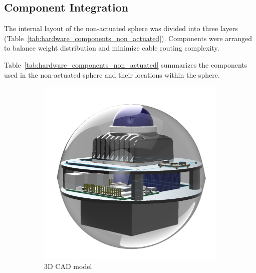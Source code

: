 \documentclass[english, bachelor, utf8]{base/thesis_telematics}
\begin{document}
\subsection{Component Integration}
The internal layout of the non-actuated sphere was divided into three layers (Table~\ref{tab:hardware_components_non_actuated}).
Components were arranged to balance weight distribution and minimize cable routing complexity.

Table~\ref{tab:hardware_components_non_actuated} summarizes the components used in the non-actuated sphere and their locations within the sphere.
\begin{figure}
\centering
\begin{subfigure}{0.4\columnwidth}
    \centering
    \includegraphics[width=\textwidth]{pics/Non_actuated_Sphere_CAD.png}
    \caption{3D CAD model}
    \label{fig:cad-model}
\end{subfigure}
\hfill
\begin{subfigure}{0.4\columnwidth}
    \centering

\end{subfigure}
\end{figure}
\end{document}

